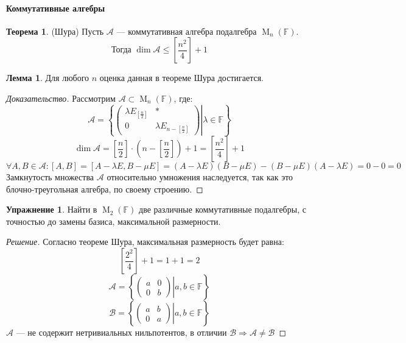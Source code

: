 \documentclass[a4paper, 14pt]{extarticle}
\theoremstyle{definition}
\newtheorem{theorem}{Теорема}
\newtheorem{lemma}{Лемма}
\newtheorem{exec}{Упражнение}
\begin{document}
\paragraph{Коммутативные алгебры}

\begin{theorem}
	(Шура) Пусть \(\mathcal{A}\) --- коммутативная алгебра подалгебра \(\operatorname{M}_n(\mathbb{F})\).
	\[\text{Тогда } \operatorname{dim}\mathcal{A} \leqslant \left[  \frac{n^2}{4} \right] + 1\]
\end{theorem}

\begin{lemma}
	Для любого \(n\) оценка данная в теореме Шура достигается.
\end{lemma}

\begin{proof}[Доказательство]
	Рассмотрим \(\mathcal{A} \subset \operatorname{M}_n(\mathbb{F})\), где:
	\[\mathcal{A} = \left\{ \left. \left(
		\begin{array}{c|c}
			\lambda E_{\left[ \frac{n}{2} \right]} & * \\
			\hline
			0 & \lambda E_{n - \left[ \frac{n}{2} \right]}
		\end{array}
	 \right) \right| \lambda \in \mathbb{F} \right\}\]
	 \[\operatorname{dim}\mathcal{A} = \left[ \frac{n}{2} \right] \cdot \left( n - \left[ \frac{n}{2} \right] \right) + 1 = \left[ \frac{n^2}{4} \right] + 1\]
	 \[\forall A, B \in \mathcal{A}: [A, B] = [A - \lambda E, B - \mu E] = (A - \lambda E)(B - \mu E) - (B - \mu E)(A - \lambda E) = 0 - 0 = 0\]
	 Замкнутость множества \(\mathcal{A}\) относительно умножения наследуется, так как это блочно-треугольная алгебра, по своему строению.
\end{proof}

\begin{exec}
	Найти в \(\operatorname{M}_2(\mathbb{F})\) две различные коммутативные подалгебры, с точностью до замены базиса, максимальной размерности.
\end{exec}

\begin{proof}[Решение]
	Согласно теореме Шура, максимальная размерность будет равна:
	\[\left[ \frac{2^2}{4} \right] + 1 = 1 + 1 = 2\]
	\[\mathcal{A} = \left\{ \left. \left(
		\begin{array}{cc}
			a & 0 \\
			0 & b
		\end{array}
	\right) \right| a, b \in \mathbb{F} \right\}\]
	\[\mathcal{B} = \left\{ \left. \left(
	\begin{array}{cc}
		a & b \\
		0 & a
	\end{array}
	\right) \right| a, b \in \mathbb{F} \right\}\]
	\(\mathcal{A}\) --- не содержит нетривиальных нильпотентов, в отличии \(\mathcal{B} \Rightarrow \mathcal{A} \neq \mathcal{B}\)
\end{proof}
\end{document}
